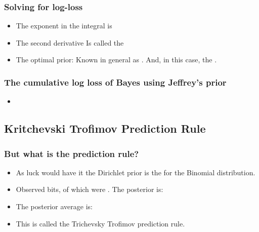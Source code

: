 \documentclass{beamer}
\begin{document}
\begin{frame}
\frametitle{Solving for log-loss}
\begin{itemize}
\item
The exponent in the integral is
\R{\[
g(\btheta,\theta) - g(\btheta,\btheta)
=
\btheta \ln {\btheta \over \theta} + 
(1-\btheta) \ln {1-\btheta \over 1-\theta}
=
D_{KL} (\btheta || \theta)
\]}
\item
The second derivative
\R{\[
\left. {d^2 \over d\theta^2} \right|_{\theta=\btheta} 
D_{KL} (\btheta || \theta) = \btheta (1-\btheta)
\]}
Is called the 
\item
The optimal prior:
\R{\[
\dweight{\btheta}{*} = \frac{1}{\pi \sqrt{\btheta (1-\btheta)}}
\]}
Known in general as .  And, in this case, 
the .
\end{itemize}
\end{frame}

\begin{frame}
\frametitle{The cumulative log loss of Bayes using Jeffrey's prior}
\begin{itemize}
\item
{}
\end{itemize}
\end{frame}

\subsection{Kritchevski Trofimov Prediction Rule}
\begin{frame}
\frametitle{But what is the prediction rule?}
\begin{itemize}
\item As luck would have it the Dirichlet prior is the  for the Binomial distribution.
\item
Observed  bits,  of which were . The posterior is:
\R{\[
\frac{1}{Z \sqrt{\theta(1-\theta)}} \theta^n (1-\theta)^{t-n} 
 = 
\frac{1}{Z} \theta^{n-1/2} (1-\theta)^{t-n-1/2} 
\]}
\item
The posterior average is:
\R{\[
\frac{\int_0^1 \theta^{n+1/2} (1-\theta)^{t-n-1/2} d\theta}
{\int_0^1 \theta^{n-1/2} (1-\theta)^{t-n-1/2} d\theta}
=
\frac{n+1/2}{t+1}
\]}
\item This is called the Trichevsky Trofimov prediction rule.
\end{itemize}
\end{frame}
\end{document}
